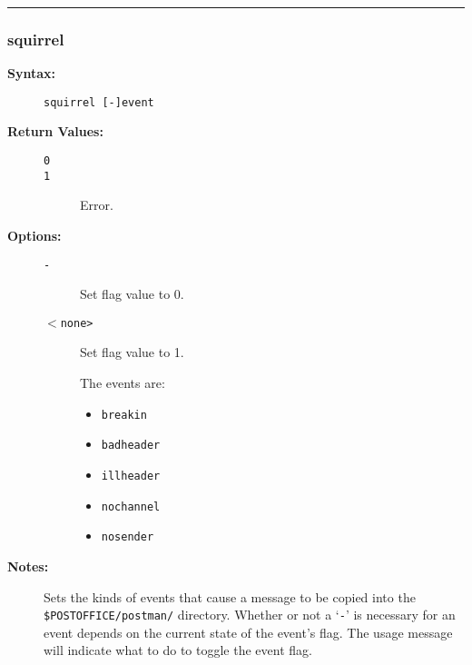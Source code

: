 \hrule
\subsubsection{squirrel}

\begin{description}
\item[{\bf Syntax:}] \mbox{}

{\tt squirrel [-]event}

\item[{\bf Return Values:}] \mbox{}

\begin{description}
\item[{\tt 0}] \mbox{}



\item[{\tt 1}] \mbox{}

Error.

\end{description}


\item[{\bf Options:}] \mbox{}

\begin{description}
\item[{\tt -}] \mbox{}

Set flag value to 0.

\item[{\tt {\(<\)}none>}] \mbox{}

Set flag value to 1. 

The events are: 
\begin{itemize}
\item {\tt breakin}
\item {\tt badheader}
\item {\tt illheader}
\item {\tt nochannel}
\item {\tt nosender}
\end{itemize}


\end{description}


\item[{\bf Notes:}] \mbox{}

Sets the kinds of events that cause a message 
to be copied into the {\tt \$POSTOFFICE/postman/} directory. 
Whether or not a `{\tt -}' is necessary for an event depends on 
the current state of the event's flag. The usage message will 
indicate what to do to toggle the event flag. 

\end{description}


